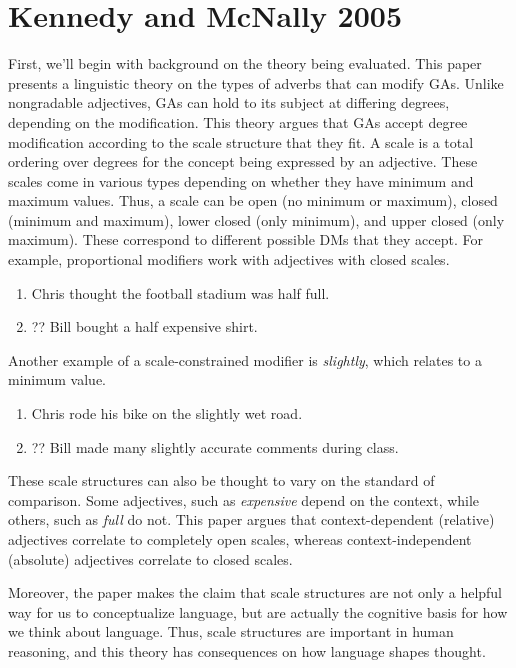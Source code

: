 \documentclass[11pt]{article}
\begin{document}
\section{Kennedy and McNally 2005}

First, we'll begin with background on the theory being evaluated. This paper presents a linguistic theory on the types of adverbs that can modify GAs. Unlike nongradable adjectives, GAs can hold to its subject at differing degrees, depending on the modification. This theory argues that GAs accept degree modification according to the scale structure that they fit.  A scale is a total ordering over degrees for the concept being expressed by an adjective. These scales come in various types depending on whether they have minimum and maximum values. Thus, a scale can be open (no minimum or maximum), closed (minimum and maximum), lower closed (only minimum), and upper closed (only maximum). These correspond to different possible DMs that they accept. For example, proportional modifiers work with adjectives with closed scales.

\begin{enumerate}
\item Chris thought the football stadium was half full.
\item ?? Bill bought a half expensive shirt.
\end{enumerate}

Another example of a scale-constrained modifier is \textit{slightly}, which relates to a minimum value.

\begin{enumerate}
\item Chris rode his bike on the slightly wet road.
\item ?? Bill made many slightly accurate comments during class.
\end{enumerate}

These scale structures can also be thought to vary on the standard of comparison. Some adjectives, such as \textit{expensive} depend on the context, while others, such as \textit{full} do not. This paper argues that context-dependent (relative) adjectives correlate to completely open scales, whereas context-independent (absolute) adjectives correlate to closed scales. 

Moreover, the paper makes the claim that scale structures are not only a helpful way for us to conceptualize language, but are actually the cognitive basis for how we think about language. Thus, scale structures are important in human reasoning, and this theory has consequences on how language shapes thought.
\end{document}
